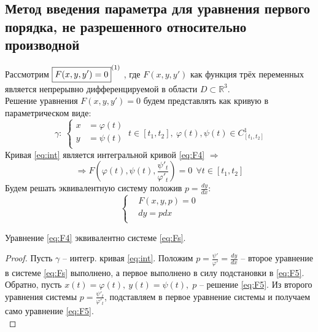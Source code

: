 \subsection{Метод введения параметра для уравнения первого порядка, не разрешенного относительно производной}
\begin{proposition}
	Рассмотрим $ \boxed{F(x,  y, y') = 0}^{\eqnum\label{eq:F4}} \ $, где $ F(x, y, y') $ как функция трёх переменных является непрерывно дифференцируемой в области $ D \subset \mathbb{ R }^3 $. \\
	Решение уравнения $F(x, y, y') = 0 $ будем представлять как кривую в параметрическом виде: \\
	\begin{equation} \label{eq:int}
	\gamma: \	\left\{
	\begin{aligned}
		x &= \varphi(t)  \\
		y &= \psi(t) \\   
	\end{aligned}
	\right. \ t \in [t_1, t_2], \ \varphi(t), \psi(t) \in C^1_{[t_1, t_2]}                                             
	\end{equation}
	Кривая \eqref{eq:int} является интегральной кривой \eqref{eq:F4} $ \Rightarrow $ \\
	\begin{equation} \label{eq:F5}
	 \Rightarrow F\left(\varphi(t), \psi(t), \frac{\psi'_t}{\varphi'_t}\right) = 0 \ \ \forall t \in [t_1, t_2] 
	\end{equation}
	Будем решать эквивалентную систему положив $p = \frac{dy}{dx} $: 
	\begin{equation} \label{eq:Fs}
		\left\{
		\begin{aligned}
			&F(x, y, p) = 0  \\
			&dy = pdx \\   
		\end{aligned}
		\right.                                                          
	\end{equation}
\end{proposition}

\begin{proposition}
	Уравнение \eqref{eq:F4} эквивалентно системе \eqref{eq:Fs}.
\end{proposition}

\begin{proof}
	Пусть $\gamma $ -- интегр. кривая \eqref{eq:int}. Положим $ p = \frac{\psi'}{\varphi'} = \frac{dy}{dx} $ -- второе уравнение в системе \eqref{eq:Fs} выполнено, а первое выполнено в силу подстановки в \eqref{eq:F5}. Обратно, пусть $x(t) = \varphi(t), \ y(t) = \psi(t), \; p$ -- решение \eqref{eq:F5}. Из второго уравнения системы
	$ p = \frac{\psi'_t}{\varphi'_t}$, подставляем в первое уравнение системы и получаем само уравнение \eqref{eq:F5}.\\
\end{proof}

